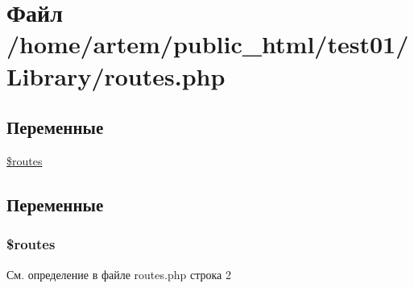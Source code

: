 \hypertarget{routes_8php}{\section{Файл /home/artem/public\-\_\-html/test01/\-Library/routes.php}
\label{routes_8php}
}
\subsection*{Переменные}
\begin{DoxyCompactItemize}
\item 
\hyperlink{routes_8php_a8f7eb04a54e0f0bfc0cedeb9899ce4a8}{\$routes}
\end{DoxyCompactItemize}


\subsection{Переменные}
\hypertarget{routes_8php_a8f7eb04a54e0f0bfc0cedeb9899ce4a8}{
\subsubsection[{\$routes}]{\setlength{\rightskip}{0pt plus 5cm}\$routes}}\label{routes_8php_a8f7eb04a54e0f0bfc0cedeb9899ce4a8}


См. определение в файле routes.\-php строка 2

